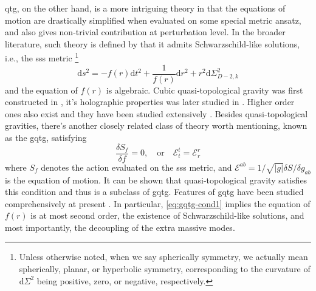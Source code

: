 \documentclass[a4paper,11pt]{article}
\newcommand{\dd}{{\mathrm d}}
\begin{document}
\Ac{qtg}, on the other hand, is a more intriguing theory in that the equations of motion are drastically simplified when evaluated on some special metric ansatz, and also gives non-trivial contribution at perturbation level. In the broader literature, such theory is defined by that it admits Schwarzschild-like solutions, i.e., the \ac{sss} metric \footnote{Unless otherwise noted, when we say spherically symmetry, we actually mean spherically, planar, or hyperbolic symmetry, corresponding to the curvature of $\dd\Sigma^2$ being positive, zero, or negative, respectively.}
\begin{equation}\label{eq:sss-metric}
    \dd s^2 = -f(r) \dd t^2 + \frac{1}{f(r)} \dd r^2 + r^2\dd\Sigma_{D-2, k}^2
\end{equation}
and the equation of $f(r)$ is algebraic. Cubic quasi-topological gravity was first constructed in \cite{bhs-in-qtg}, it's holographic properties was later studied in \cite{holographic-cubic-qtg}. Higher order ones also exist and they have been studied extensively \cite{new-cubic-5d-qtg, bhs-in-quartic-qtg, quintessential-quartic-qtg, quintic-qtg}. Besides quasi-topological gravities, there's another closely related class of theory worth mentioning, known as the \ac{gqtg}, satisfying \cite{cubic-gqtg, gqtg-at-all-order}
\begin{equation}\label{eq:gqtg-cond1}
    \frac{\delta S_f}{\delta f} = 0, \quad \text{or} \quad \mathcal E_t^t = \mathcal E_r^r
\end{equation}
where $S_f$ denotes the action evaluated on the \ac{sss} metric, and $\mathcal E^{ab} = 1 / \sqrt{|g|} \delta S / \delta g_{ab}$ is the equation of motion. It can be shown that quasi-topological gravity satisfies this condition and thus is a subclass of \ac{gqtg}. Features of \ac{gqtg} have been studied comprehensively at present \cite{einsteinian-cubic-gravity, bhs-in-ecg, 4d-bhs-in-ecg, holographic-ecg, bh-chem-and-holography-in-gqtg, cubic-quartic-gqtg-thermo-holography, higher-gravity-with-mu, gqtg-at-all-order, all-higher-as-gqtg, gqtg-whole-shebang}. In particular, \eqref{eq:gqtg-cond1} implies \cite{all-higher-as-gqtg} the equation of $f(r)$ is at most second order, the existence of Schwarzschild-like solutions, and most importantly, the decoupling of the extra massive modes.
\end{document}
